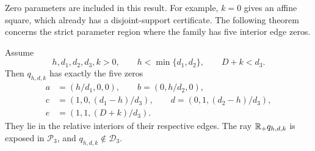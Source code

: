 Zero parameters are included in this result. For example, $k=0$ gives an
affine square, which already has a disjoint-support certificate. The
following theorem concerns the strict parameter region where the family
has five interior edge zeros.

\begin{theorem}
\label{family:exposed}
Assume
\begin{equation}
\label{family:strict-region}
h,d_1,d_2,d_3,k>0,\qquad h<\min\{d_1,d_2\},\qquad D+k<d_3.
\end{equation}
Then $q_{h,d,k}$ has exactly the five zeros
\begin{equation}
\label{family:contacts}
\begin{split}
a&=(h/d_1,0,0),\qquad b=(0,h/d_2,0),\\
c&=(1,0,(d_1-h)/d_3),\qquad
d=(0,1,(d_2-h)/d_3),\\
e&=(1,1,(D+k)/d_3).
\end{split}
\end{equation}
They lie in the relative interiors of their respective edges.
The ray $\mathbb R_+q_{h,d,k}$ is exposed in $\mathcal P_3$, and
$q_{h,d,k}\notin\mathcal D_3$.
\end{theorem}

